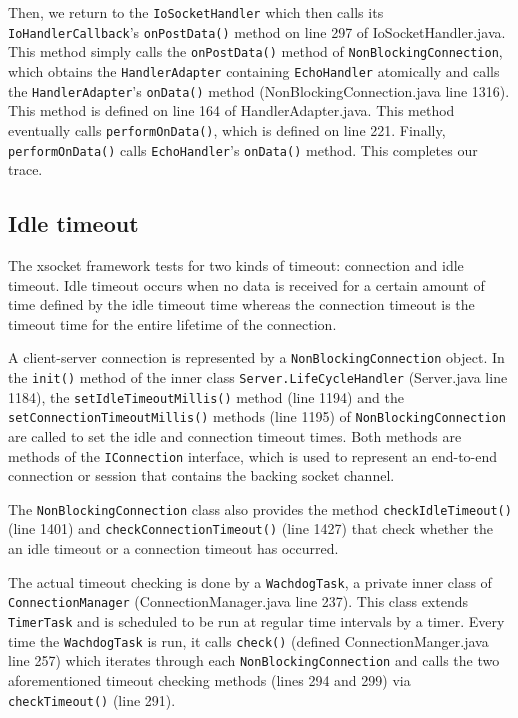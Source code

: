 \documentclass[letterpaper,12pt]{article}
\begin{document}
Then, we return to the \texttt{IoSocketHandler} which then calls its \texttt{IoHandlerCallback}'s \texttt{onPostData()} method on line 297 of IoSocketHandler.java. This method simply calls the \texttt{onPostData()} method of \texttt{NonBlockingConnection}, which obtains the \texttt{HandlerAdapter} containing \texttt{EchoHandler} atomically and calls the \texttt{HandlerAdapter}'s \texttt{onData()} method (NonBlockingConnection.java line 1316). This method is defined on line 164 of HandlerAdapter.java. This method eventually calls \texttt{performOnData()}, which is defined on line 221. Finally, \texttt{performOnData()} calls \texttt{EchoHandler}'s \texttt{onData()} method. This completes our trace.

\subsection{Idle timeout}

The xsocket framework tests for two kinds of timeout: connection and idle timeout. Idle timeout occurs when no data is received for a certain amount of time defined by the idle timeout time whereas the connection timeout is the timeout time for the entire lifetime of the connection.

A client-server connection is represented by a \texttt{NonBlockingConnection} object. In the \texttt{init()} method of the inner class \texttt{Server.LifeCycleHandler} (Server.java line 1184), the \texttt{setIdleTimeoutMillis()} method (line 1194) and the \texttt{setConnectionTimeoutMillis()} methods (line 1195) of \texttt{NonBlockingConnection} are called to set the idle and connection timeout times. Both methods are methods of the \texttt{IConnection} interface, which is used to represent an end-to-end connection or session that contains the backing socket channel.

The \texttt{NonBlockingConnection} class also provides the method \texttt{checkIdleTimeout()} (line 1401) and \texttt{checkConnectionTimeout()} (line 1427) that check whether the an idle timeout or a connection timeout has occurred.

The actual timeout checking is done by a \texttt{WachdogTask}, a private inner class of \texttt{ConnectionManager} (ConnectionManager.java line 237). This class extends \texttt{TimerTask} and is scheduled to be run at regular time intervals by a timer. Every time the \texttt{WachdogTask} is run, it calls \texttt{check()} (defined ConnectionManger.java line 257) which iterates through each \texttt{NonBlockingConnection} and calls the two aforementioned timeout checking methods (lines 294 and 299) via \texttt{checkTimeout()} (line 291).
\end{document}
